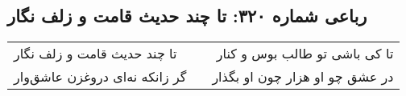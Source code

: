\begin{center}
\section*{رباعی شماره ۳۲۰: تا چند حدیث قامت و زلف نگار}
\label{sec:sh320}
\begin{longtable}{l p{0.5cm} r}
تا چند حدیث قامت و زلف نگار
&&
تا کی باشی تو طالب بوس و کنار
\\
گر زانکه نه‌ای دروغزن عاشق‌وار
&&
در عشق چو او هزار چون او بگذار
\\
\end{longtable}
\end{center}
